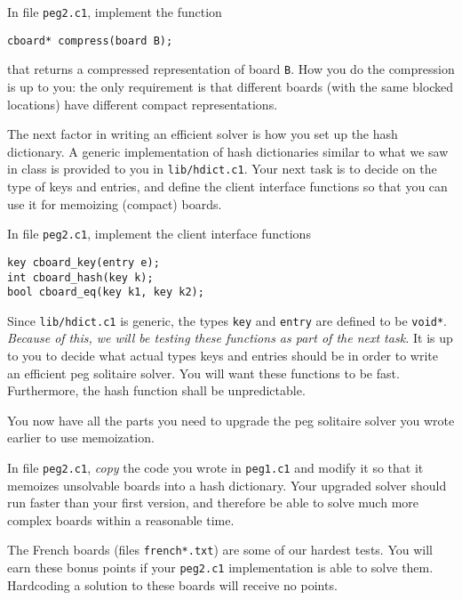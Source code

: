 \documentclass[12pt]{exam}
\begin{document}
\begin{task}[2]
In file \lstinline'peg2.c1', implement the function
\begin{lstlisting}
cboard* compress(board B);
\end{lstlisting}
that returns a compressed representation of board \lstinline'B'.  How
you do the compression is up to you: the only requirement is that
different boards (with the same blocked locations) have different
compact representations.
\end{task}

\medskip
The next factor in writing an efficient solver is how you set up the
hash dictionary.  A generic implementation of hash dictionaries
similar to what we saw in class is provided to you in
\lstinline'lib/hdict.c1'.  Your next task is to decide on the type of
keys and entries, and define the client interface functions so that
you can use it for memoizing (compact) boards.

\begin{task}[0]
In file \lstinline'peg2.c1', implement the client interface functions
\begin{lstlisting}
key cboard_key(entry e);
int cboard_hash(key k);
bool cboard_eq(key k1, key k2);
\end{lstlisting}
Since \lstinline'lib/hdict.c1' is generic, the types \lstinline'key' and
\lstinline'entry' are defined to be \lstinline'void*'.  \emph{Because
  of this, we will be testing these functions as part of the next
  task.}  It is up to you to decide what actual types keys and entries
should be in order to write an efficient peg solitaire solver.  You
will want these functions to be fast.  Furthermore, the hash function
shall be unpredictable.
\end{task}


You now have all the parts you need to upgrade the peg solitaire
solver you wrote earlier to use memoization.

\begin{task}[7]
  In file \lstinline'peg2.c1', \emph{copy} the code you wrote in
  \lstinline'peg1.c1' and modify it so that it memoizes unsolvable
  boards into a hash dictionary.  Your upgraded solver should run
  faster than your first version, and therefore be able to solve much
  more complex boards within a reasonable time.
\end{task}

\begin{ectask}[2]
  The French boards (files \lstinline'french*.txt') are some of our
  hardest tests.  You will earn these bonus points if your
  \lstinline'peg2.c1' implementation is able to solve them.
  Hardcoding a solution to these boards will receive no points.
\end{ectask}
\end{document}
